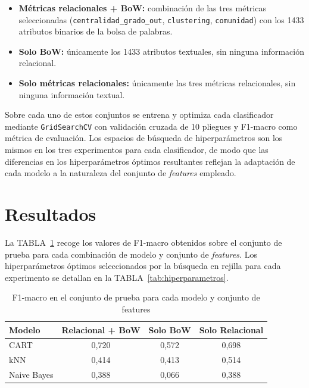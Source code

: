 \documentclass[conference,a4paper]{IEEEtran}
\def\tablename{TABLA}
\begin{document}
\begin{itemize}
    \item \textbf{Métricas relacionales + BoW:} combinación de las tres 
    métricas seleccionadas (\texttt{centralidad\_grado\_out}, 
    \texttt{clustering}, \texttt{comunidad}) con los 1433 atributos 
    binarios de la bolsa de palabras.
    \item \textbf{Solo BoW:} únicamente los 1433 atributos textuales, 
    sin ninguna información relacional.
    \item \textbf{Solo métricas relacionales:} únicamente las tres 
    métricas relacionales, sin ninguna información textual.
\end{itemize}

Sobre cada uno de estos conjuntos se entrena y optimiza cada clasificador 
mediante \texttt{GridSearchCV} con validación cruzada de 10 pliegues y 
F1-macro como métrica de evaluación. Los espacios de búsqueda de 
hiperparámetros son los mismos en los tres experimentos para cada 
clasificador, de modo que las diferencias en los hiperparámetros óptimos 
resultantes reflejan la adaptación de cada modelo a la naturaleza del 
conjunto de \emph{features} empleado.


\section{Resultados}
\label{sec:resultados}

La \tablename~\ref{tab:resultados} recoge los valores de F1-macro 
obtenidos sobre el conjunto de prueba para cada combinación de 
modelo y conjunto de \emph{features}. Los hiperparámetros óptimos 
seleccionados por la búsqueda en rejilla para cada experimento se 
detallan en la \tablename~\ref{tab:hiperparametros}.

\begin{table}[htbp]
  \caption{F1-macro en el conjunto de prueba para cada modelo y conjunto de features}
  \label{tab:resultados}
  \centering
  \begin{tabular}{lccc}
    \toprule
    Modelo & Relacional + BoW & Solo BoW & Solo Relacional \\
    \midrule
    CART            & 0{,}720 & 0{,}572 & 0{,}698 \\
    kNN             & 0{,}414 & 0{,}413 & 0{,}514 \\
    Naive Bayes     & 0{,}388 & 0{,}066 & 0{,}388 \\
    \bottomrule
  \end{tabular}
\end{table}
\end{document}
